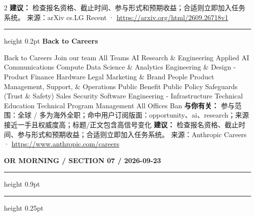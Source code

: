 \documentclass[10.5pt]{ctexart}
\begin{document}
\begin{multicols}{2}
\textbf{建议：} 检查报名资格、截止时间、参与形式和预期收益；合适则立即加入任务系统。
{\footnotesize\color{ormuted} 来源：arXiv cs.LG Recent · \url{https://arxiv.org/html/2609.26718v1}}
\vspace{2mm}
\hrule height 0.2pt
\vspace{2mm}
{\large\bfseries Back to Careers}\par
Back to Careers Join our team All Teams AI Research \& Engineering Applied AI Communications Compute Data Science \& Analytics Engineering \& Design - Product Finance Hardware Legal Marketing \& Brand People Product Management, Support, \& Operations Public Benefit Public Policy Safeguards (Trust \& Safety) Sales Security Software Engineering - Infrastructure Technical Education Technical Program Management All Offices Ban
\textbf{与你有关：} 参与范围：全球 / 多为海外全职；命中用户订阅版面：opportunity、ai、research；来源接近一手且权威度高；标题/正文包含高信号变化
\textbf{建议：} 检查报名资格、截止时间、参与形式和预期收益；合适则立即加入任务系统。
{\footnotesize\color{ormuted} 来源：Anthropic Careers · \url{https://www.anthropic.com/careers}}
\end{multicols}
\newpage
{\small\bfseries OR MORNING / SECTION 07 / 2026-09-23}
\vspace{2mm}
\hrule height 0.9pt
\vspace{1.5mm}
\hrule height 0.25pt
\vspace{4mm}
\end{document}
